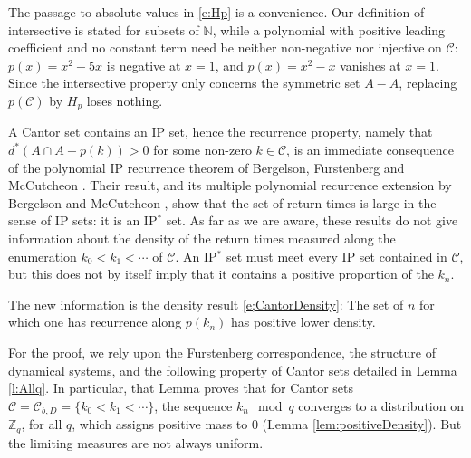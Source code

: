 The passage to absolute values in \eqref{e:Hp} is a convenience. 
Our definition of intersective is stated for subsets of $\mathbb{N}$, while a polynomial with positive leading coefficient and no constant term need be neither non-negative nor injective on $\mathcal C$: 
$p(x)=x^2-5x$ is negative at $x=1$, and $p(x)=x^2-x$ vanishes at $x=1$. 
Since the intersective property only concerns the symmetric set $A-A$, replacing $p(\mathcal C)$ by $H_p$ loses nothing.

A Cantor set contains an IP set, hence the recurrence property, namely that $d^\ast(A\cap A-p(k))>0$ for some non-zero $k\in\mathcal C$, is an immediate consequence of the polynomial IP recurrence theorem of Bergelson, Furstenberg and McCutcheon \cite{MR1417769}. 
Their result, and its multiple polynomial recurrence extension by Bergelson and McCutcheon \cite{BergelsonMcCutcheon2000}, show that the set of return times is large in the sense of IP sets: it is an IP$^\ast$ set. 
As far as we are aware, these results do not give information about the density of the return times measured along the enumeration $k_0<k_1<\cdots$ of $\mathcal C$. 
An IP$^\ast$ set must meet every IP set contained in $\mathcal C$, but this does not by itself imply that it contains a positive proportion of the $k_n$. 

The new information is the density result \eqref{e;CantorDensity}: The set of $n$ for which one has recurrence along $p(k_n)$ has positive lower density.  

For the proof, we rely upon the Furstenberg correspondence, the structure of dynamical systems, and  the following property of Cantor sets detailed in 
Lemma \ref{l:Allq}.  
In particular, that Lemma proves that for Cantor sets 
 $\mathcal C = \mathcal C_{b,D} 
= \{k_0<k_1 < \cdots\}$, 
the sequence $ k_n\mod q$ converges to a distribution on $\mathbb{Z} _q$, for all $q$, which assigns positive mass to $0$ (Lemma \ref{lem:positiveDensity}).  But   the limiting measures   are not always uniform. 


 


